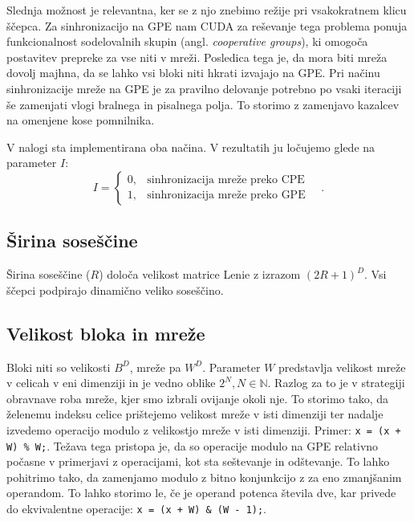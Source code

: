 \documentclass[a4paper, 12pt, openright]{book}
\begin{document}
Slednja možnost je relevantna, ker se z njo znebimo režije pri vsakokratnem klicu ščepca.
Za sinhronizacijo na GPE nam CUDA za reševanje tega problema ponuja funkcionalnost sodelovalnih skupin (angl. \textit{cooperative groups}), ki omogoča postavitev prepreke za vse niti v mreži.
Posledica tega je, da mora biti mreža dovolj majhna, da se lahko vsi bloki niti hkrati izvajajo na GPE.
Pri načinu sinhronizacije mreže na GPE je za pravilno delovanje potrebno po vsaki iteraciji še zamenjati vlogi bralnega in pisalnega polja.
To storimo z zamenjavo kazalcev na omenjene kose pomnilnika.

V nalogi sta implementirana oba načina. V rezultatih ju ločujemo glede na parameter \(I\):
\begin{displaymath}
    I = \begin{cases}
        0, & \text{sinhronizacija mreže preko CPE}    \\
        1, & \text{sinhronizacija mreže preko GPE}
    \end{cases}\quad.
\end{displaymath}

\subsection{Širina soseščine}

Širina soseščine (\(R\)) določa velikost matrice Lenie z izrazom \((2R + 1) ^ D\). Vsi ščepci podpirajo dinamično veliko soseščino.

\subsection{Velikost bloka in mreže}

Bloki niti so velikosti \(B^D\), mreže pa \(W^D\).
Parameter \(W\) predstavlja velikost mreže v celicah v eni dimenziji in je vedno oblike \(2^N, N \in \mathbb{N}\).
Razlog za to je v strategiji obravnave roba mreže, kjer smo izbrali ovijanje okoli nje.
To storimo tako, da želenemu indeksu celice prištejemo velikost mreže v isti dimenziji ter nadalje izvedemo operacijo modulo z velikostjo mreže v isti dimenziji. Primer:
\verb|x = (x + W) % W;|.
Težava tega pristopa je, da so operacije modulo na GPE relativno počasne v primerjavi z operacijami, kot sta seštevanje in odštevanje.
To lahko pohitrimo tako, da zamenjamo modulo z bitno konjunkcijo z za eno zmanjšanim operandom.
To lahko storimo le, če je operand potenca števila dve, kar privede do ekvivalentne operacije:
\verb|x = (x + W) & (W - 1);|.
\end{document}
